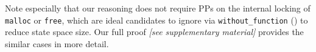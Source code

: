 Note especially that our reasoning does not require PPs on the internal locking of {\tt malloc} or {\tt free},
which are ideal candidates to ignore via {\tt without\_function} (\sect{\ref{sec:landslide}}) to reduce state space size.
Our full proof
{\em [see supplementary material]}
provides the similar cases in more detail.
\renewcommand\proofname{Proof}

